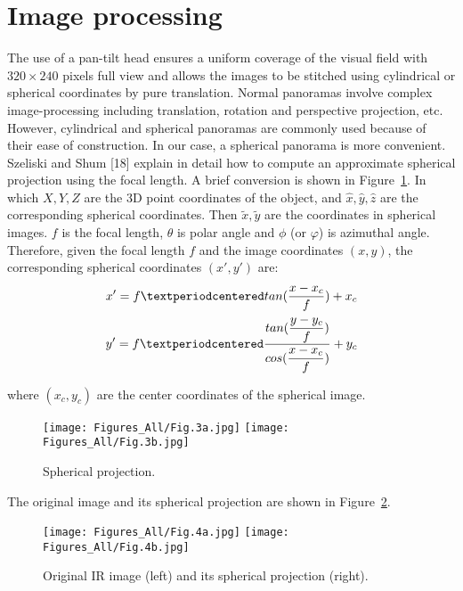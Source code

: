 \documentclass{tQRT2e}
\begin{document}
\section{Image processing}
The use of a pan-tilt head ensures a uniform coverage of the visual field with $ 320×240 $ pixels full view and allows the images to be stitched using cylindrical or spherical coordinates by pure translation. Normal panoramas involve complex image-processing including translation, rotation and perspective projection, etc. However, cylindrical and spherical panoramas are commonly used because of their ease of construction. In our case, a spherical panorama is more convenient. Szeliski and Shum [18] explain in detail how to compute an approximate spherical projection using the focal length. A brief conversion is shown in Figure~\ref{Sph_pro}. In which $X, Y, Z$ are the 3D point coordinates of the object, and $\hat{x}, \hat{y}, \hat{z}$ are the corresponding spherical coordinates. Then $\tilde{x}, \tilde{y}$ are the coordinates in spherical images. $f$ is the focal length, $\theta$ is polar angle and $\phi$ (or $\varphi$) is azimuthal angle. Therefore, given the focal length $ f $ and the image coordinates $ (x, y) $, the corresponding spherical coordinates $ (x', y') $ are:
\begin{align}
x'={} f·tan(\dfrac{x-x_c}{f})+x_c \notag \\
y'=f·\frac{tan(\dfrac{y-y_c}{f})}{cos(\dfrac{x-x_c}{f})} +y_c
\end{align}

where $ (x_c,y_c) $ are the center coordinates of the spherical image.
\begin{figure}[ht]
	\centering
	\texttt{[image: Figures\_All/Fig.3a.jpg]}
	\texttt{[image: Figures\_All/Fig.3b.jpg]}
	\caption{Spherical projection.}
	\label{Sph_pro}
\end{figure}

The original image and its spherical projection are shown in Figure~\ref{Orig_sph}.
\begin{figure}[ht]
	\centering
	\texttt{[image: Figures\_All/Fig.4a.jpg]}
	\texttt{[image: Figures\_All/Fig.4b.jpg]}
	\caption{Original IR image (left) and its spherical projection (right).}
	\label{Orig_sph}
\end{figure}
\end{document}
